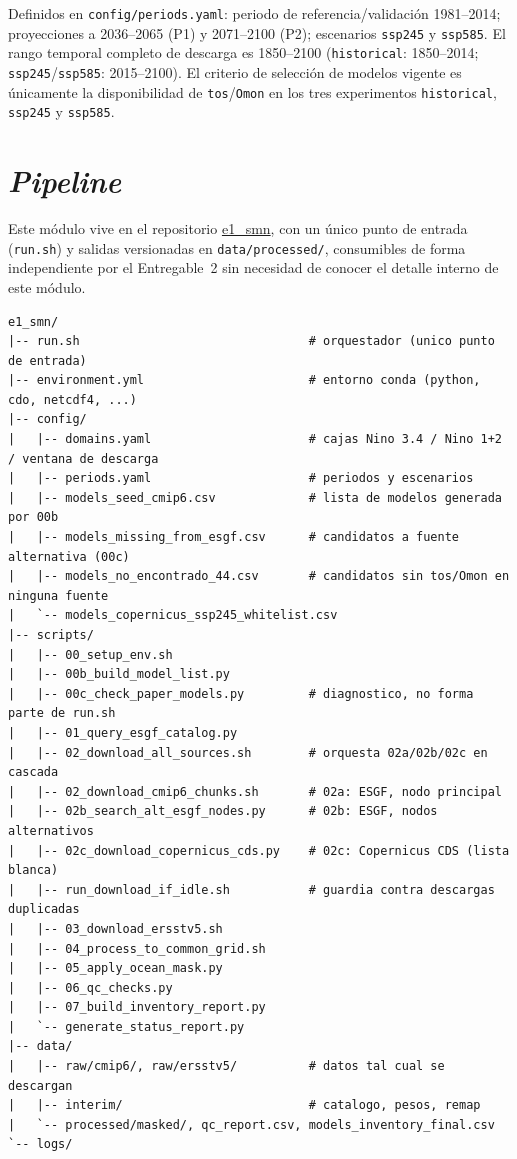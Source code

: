 \documentclass[11pt,a4paper]{article}
\newcommand{\archivo}[1]{\begingroup\hypersetup{urlcolor=black}\url{#1}\endgroup}
\begin{document}
Definidos en \texttt{config/periods.yaml}: periodo de referencia/validaci\'on 1981--2014; proyecciones a 2036--2065 (P1) y 2071--2100 (P2); escenarios \texttt{ssp245} y \texttt{ssp585}. El rango temporal completo de descarga es 1850--2100 (\texttt{historical}: 1850--2014; \texttt{ssp245}/\texttt{ssp585}: 2015--2100). El criterio de selecci\'on de modelos vigente es \'unicamente la disponibilidad de \texttt{tos}/\texttt{Omon} en los tres experimentos \texttt{historical}, \texttt{ssp245} y \texttt{ssp585}.

\section{\emph{Pipeline}}
\label{sec:arquitectura}

Este m\'odulo vive en el repositorio \archivo{e1_smn}, con un \'unico punto de entrada (\texttt{run.sh}) y salidas versionadas en \texttt{data/processed/}, consumibles de forma independiente por el Entregable~2 sin necesidad de conocer el detalle interno de este m\'odulo.

\begin{lstlisting}[style=bashstyle,caption={Estructura interna del repositorio \texttt{e1\_smn}.},label={lst:tree}]
e1_smn/
|-- run.sh                                # orquestador (unico punto de entrada)
|-- environment.yml                       # entorno conda (python, cdo, netcdf4, ...)
|-- config/
|   |-- domains.yaml                      # cajas Nino 3.4 / Nino 1+2 / ventana de descarga
|   |-- periods.yaml                      # periodos y escenarios
|   |-- models_seed_cmip6.csv             # lista de modelos generada por 00b
|   |-- models_missing_from_esgf.csv      # candidatos a fuente alternativa (00c)
|   |-- models_no_encontrado_44.csv       # candidatos sin tos/Omon en ninguna fuente
|   `-- models_copernicus_ssp245_whitelist.csv
|-- scripts/
|   |-- 00_setup_env.sh
|   |-- 00b_build_model_list.py
|   |-- 00c_check_paper_models.py         # diagnostico, no forma parte de run.sh
|   |-- 01_query_esgf_catalog.py
|   |-- 02_download_all_sources.sh        # orquesta 02a/02b/02c en cascada
|   |-- 02_download_cmip6_chunks.sh       # 02a: ESGF, nodo principal
|   |-- 02b_search_alt_esgf_nodes.py      # 02b: ESGF, nodos alternativos
|   |-- 02c_download_copernicus_cds.py    # 02c: Copernicus CDS (lista blanca)
|   |-- run_download_if_idle.sh           # guardia contra descargas duplicadas
|   |-- 03_download_ersstv5.sh
|   |-- 04_process_to_common_grid.sh
|   |-- 05_apply_ocean_mask.py
|   |-- 06_qc_checks.py
|   |-- 07_build_inventory_report.py
|   `-- generate_status_report.py
|-- data/
|   |-- raw/cmip6/, raw/ersstv5/          # datos tal cual se descargan
|   |-- interim/                          # catalogo, pesos, remap
|   `-- processed/masked/, qc_report.csv, models_inventory_final.csv
`-- logs/
\end{lstlisting}
\end{document}
